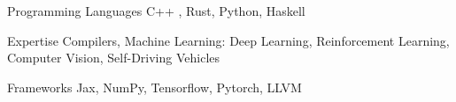 
\begin{cvskills}

  \cvskill
    {Programming Languages}
    {C++ , Rust, Python, Haskell}

  \cvskill
    {Expertise}
    {Compilers, Machine Learning: Deep Learning, Reinforcement Learning,
    Computer Vision, Self-Driving Vehicles}

  \cvskill
    {Frameworks}
    {Jax, NumPy, Tensorflow, Pytorch, LLVM}

\end{cvskills}

